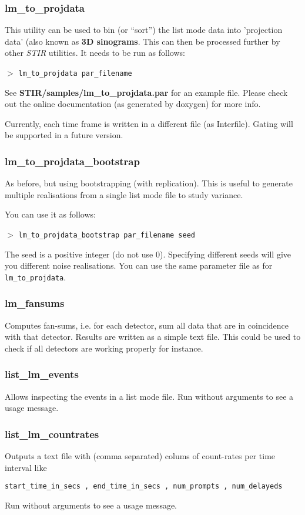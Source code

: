 \documentclass{article}
\newcommand{\cmdline}[1]{\par \noindent $>$ \texttt{#1}\par}
\begin{document}
\subsubsection{
lm\_to\_projdata}

This utility can be used to bin (or ``sort'') the list mode data 
into 'projection data' (also known as \textbf{3D sinograms}. 
This can then be processed further by other \textit{STIR} utilities. It 
needs to be run as follows:

\cmdline{lm\_to\_projdata par\_filename}


See \textbf{STIR/samples/lm\_to\_projdata.par} for an example file. Please 
check out the online documentation (as generated by doxygen) 
for more info.

Currently, each time frame is written in a different file (as Interfile). Gating 
will be supported in a future version.

\subsubsection{
lm\_to\_projdata\_bootstrap}
As before, but using bootstrapping (with replication). This is useful to generate multiple realisations 
from a single list mode file to study variance.

You can use it as follows:

\cmdline{lm\_to\_projdata\_bootstrap par\_filename seed}

The seed is a positive integer (do not use $0$). Specifying different seeds will give you different noise realisations.
You can use the same parameter file as for \texttt{lm\_to\_projdata}.

\subsubsection{
lm\_fansums}
Computes fan-sums, i.e. for each detector, sum all data that are in coincidence with that detector.
Results are written as a simple text file. This could be used to check if all detectors are working
properly for instance.

\subsubsection{
list\_lm\_events}
Allows inspecting the events in a list mode file. Run without arguments to see a usage message.

\subsubsection{
list\_lm\_countrates}
Outputs a text file with (comma separated) colums of count-rates per
time interval like
\begin{verbatim}
start_time_in_secs , end_time_in_secs , num_prompts , num_delayeds
\end{verbatim}
Run without arguments to see a usage message.
\end{document}
